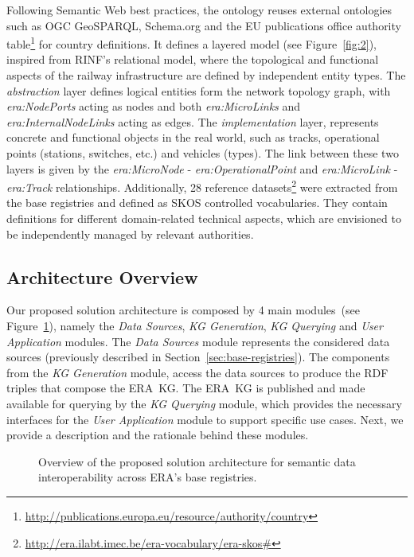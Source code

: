 Following Semantic Web best practices,
the ontology reuses external ontologies such as
OGC GeoSPARQL, Schema.org and
the EU publications office authority 
table\footnote{\url{http://publications.europa.eu/resource/authority/country}} 
for country definitions.
It defines a layered model (see Figure~\ref{fig:2}),
inspired from RINF's relational model,
where the topological and functional aspects of the railway infrastructure
are defined by independent entity types.
The \textit{abstraction} layer defines logical entities
form the network topology graph, with \textit{era:NodePorts} acting as nodes
and both \textit{era:MicroLinks} and \textit{era:InternalNodeLinks} 
acting as edges.
The \textit{implementation} layer, represents concrete
and functional objects in the real world, such as tracks,
operational points (stations, switches, etc.) and vehicles (types).
The link between these two layers is given by
the \textit{era:MicroNode} - \textit{era:OperationalPoint} 
and \textit{era:MicroLink} - \textit{era:Track} relationships.  
Additionally, 28 reference 
datasets\footnote{\url{http://era.ilabt.imec.be/era-vocabulary/era-skos\#}}
were extracted from the base registries
and defined as SKOS controlled vocabularies.
They contain definitions for different domain-related technical aspects,
which are envisioned to be independently managed by relevant authorities.

\subsection{Architecture Overview}
\label{sec:architecture}

Our proposed solution architecture is composed by 4 main 
modules~(see Figure~\ref{fig:3}),
namely the \textit{Data Sources}, \textit{KG Generation}, \textit{KG Querying} 
and \textit{User Application} modules.
The \textit{Data Sources} module represents the considered data sources
(previously described in Section~\ref{sec:base-registries}).
The components from the \textit{KG Generation} module,
access the data sources to produce the RDF triples that compose the ERA~KG.
The ERA~KG is published and made available for querying by 
the \textit{KG Querying} module,
which provides the necessary interfaces
for the \textit{User Application} module to support specific use cases.
Next, we provide a description and the rationale behind these modules.

\begin{figure}[t]
	
	\caption{Overview of the proposed solution architecture
	for semantic data interoperability across ERA's base registries.} 
	\label{fig:3}
\end{figure} 

